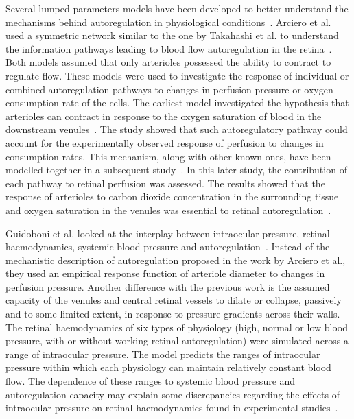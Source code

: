 \documentclass{article}
\begin{document}
Several lumped parameters models have been developed to better understand the mechanisms behind autoregulation in physiological conditions~\cite{Arciero_2008,Arciero_2013,Guidoboni_2014a}.
Arciero et al. used a symmetric network similar to the one by Takahashi et al. to understand the information pathways leading to blood flow autoregulation in the retina~\cite{Arciero_2008,Arciero_2013}.
Both models assumed that only arterioles possessed the ability to contract to regulate flow.
These models were used to investigate the response of individual or combined autoregulation pathways to changes in perfusion pressure or oxygen consumption rate of the cells.
The earliest model investigated the hypothesis that arterioles can contract in response to the oxygen saturation of blood in the downstream venules~\cite{Arciero_2008}.
The study showed that such autoregulatory pathway could account for the experimentally observed response of perfusion to changes in consumption rates.
This mechanism, along with other known ones, have been modelled together in a subsequent study~\cite{Arciero_2013}.
In this later study, the contribution of each pathway to retinal perfusion was assessed.
The results showed that the response of arterioles to carbon dioxide concentration in the surrounding tissue and oxygen saturation in the venules was essential to retinal autoregulation~\cite{Arciero_2013}.

Guidoboni et al. looked at the interplay between intraocular pressure, retinal haemodynamics, systemic blood pressure and autoregulation~\cite{Guidoboni_2014a}.
Instead of the mechanistic description of autoregulation proposed in the work by Arciero et al., they used an empirical response function of arteriole diameter to changes in perfusion pressure.
Another difference with the previous work is the assumed capacity of the venules and central retinal vessels to dilate or collapse, passively and to some limited extent, in response to pressure gradients across their walls.
The retinal haemodynamics of six types of physiology (high, normal or low blood pressure, with or without working retinal autoregulation) were simulated across a range of intraocular pressure.
The model predicts the ranges of intraocular pressure within which each physiology can maintain relatively constant blood flow.
The dependence of these ranges to systemic blood pressure and autoregulation capacity may explain some discrepancies regarding the effects of intraocular pressure on retinal haemodynamics found in experimental studies~\cite{Guidoboni_2014a}.
\end{document}
